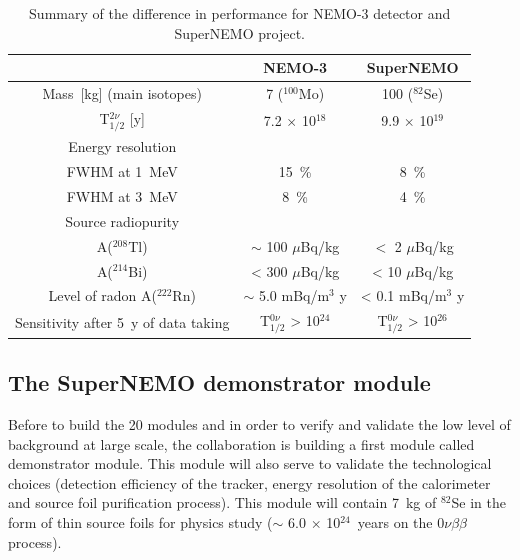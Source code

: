 \documentclass[main.tex]{subfiles}
\begin{document}
\begin{table}[h!]
\centering
\begin{tabular}{c|c|c}
      & NEMO-3 & SuperNEMO \\
\toprule
Mass~[kg] (main isotopes)           & 7 ($^{\text{100}}$Mo)         & 100 ($^{\text{82}}$Se)        \\[0.1cm]
 T$_{\text{1/2}}^{\text{2}\nu}$ [y] & 7.2 $\times$ 10$^{\text{18}}$ & 9.9 $\times$ 10$^{\text{19}}$ \\[0.1cm]
\midrule
Energy resolution & & \\
FWHM at 1~MeV                       & 15~\%                         & 8~\%                          \\[0.1cm]
FWHM at 3~MeV                       & 8~\%                          & 4~\%                          \\[0.1cm]
\midrule
Source radiopurity & & \\
A($^{\text{208}}$Tl)               & $\sim$ 100 $\mu$Bq/kg         & $<$ 2 $\mu$Bq/kg               \\[0.1cm]
A($^{\text{214}}$Bi)               & < 300 $\mu$Bq/kg              & < 10 $\mu$Bq/kg                \\[0.1cm]
\midrule
Level of radon A($^{\text{222}}$Rn)& $\sim$ 5.0 mBq/m$^\text{3}$ y   & < 0.1 mBq/m$^\text{3}$ y     \\[0.1cm]
\midrule
Sensitivity after 5~y of data taking & T$_{\text{1/2}}^{\text{0}\nu}$ > 10$^{\text{24}}$ & T$_{\text{1/2}}^{\text{0}\nu}$ > 10$^{\text{26}}$     \\[0.1cm]
\bottomrule
\end{tabular}
\caption{Summary of the difference in performance for NEMO-3 detector and SuperNEMO project.}
\label{tab:DifferenceNEMO3-SuperNEMO}
\end{table}  

\FloatBarrier


\subsection{The SuperNEMO demonstrator module}


\NI Before to build the 20 modules and in order to verify and validate the low level of background at large scale, the collaboration is building a first module called demonstrator module. This module will also serve to validate the technological choices (detection efficiency of the tracker, energy resolution of the calorimeter and source foil purification process). This module will contain 7~kg of $^{\text{82}}$Se in the form of thin source foils for physics study ($\sim$ 6.0 $\times$ 10$^{\text{24}}$~years on the 0$\nu\beta\beta$ process). 
\end{document}
